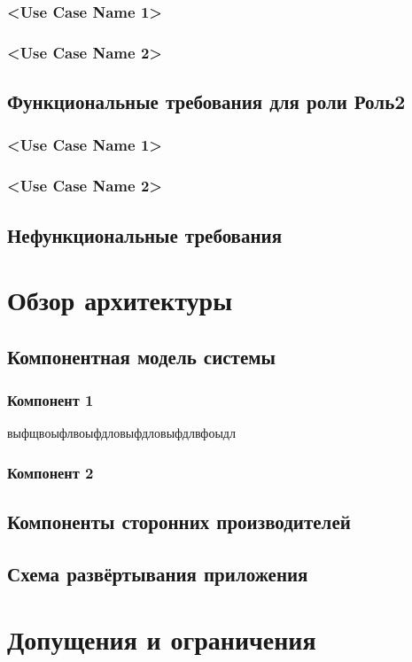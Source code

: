 \documentclass[a4paper]{report}
\begin{document}
			\subsection{<Use Case Name 1>}
		
			\subsection{<Use Case Name 2>}
		\section{Функциональные требования для роли Роль2}
			\subsection{<Use Case Name 1>}
		
			\subsection{<Use Case Name 2>}
			
		\section{Нефункциональные требования}
	\chapter{Обзор архитектуры}
		\section{Компонентная модель системы}
			\subsection{Компонент 1}
				выфщвоыфлвоыфдловыфдловыфдлвфоыдл
			\subsection{Компонент 2}
		\section{Компоненты сторонних производителей}
		
		\section{Схема развёртывания приложения}
	\chapter{Допущения и ограничения}
	
\end{document}
